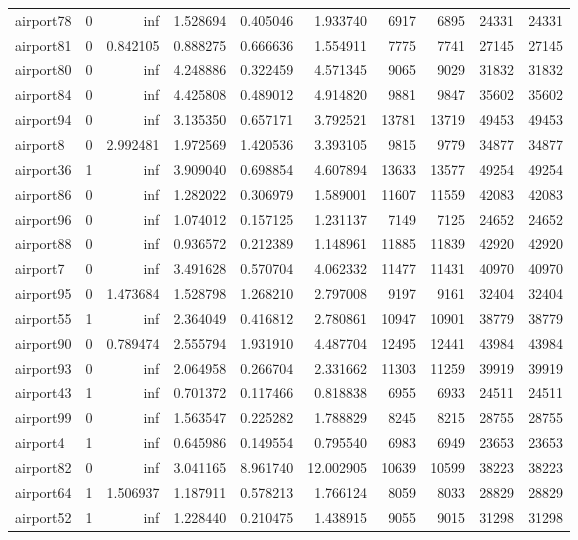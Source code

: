 \begin{longtable}{|l|r|r|r|r|r|r|r|r|r|}
airport78 & 0 & inf & 1.528694 & 0.405046 & 1.933740 & 6917 & 6895 & 24331 & 24331 \\
airport81 & 0 & 0.842105 & 0.888275 & 0.666636 & 1.554911 & 7775 & 7741 & 27145 & 27145 \\
airport80 & 0 & inf & 4.248886 & 0.322459 & 4.571345 & 9065 & 9029 & 31832 & 31832 \\
airport84 & 0 & inf & 4.425808 & 0.489012 & 4.914820 & 9881 & 9847 & 35602 & 35602 \\
airport94 & 0 & inf & 3.135350 & 0.657171 & 3.792521 & 13781 & 13719 & 49453 & 49453 \\
airport8 & 0 & 2.992481 & 1.972569 & 1.420536 & 3.393105 & 9815 & 9779 & 34877 & 34877 \\
airport36 & 1 & inf & 3.909040 & 0.698854 & 4.607894 & 13633 & 13577 & 49254 & 49254 \\
airport86 & 0 & inf & 1.282022 & 0.306979 & 1.589001 & 11607 & 11559 & 42083 & 42083 \\
airport96 & 0 & inf & 1.074012 & 0.157125 & 1.231137 & 7149 & 7125 & 24652 & 24652 \\
airport88 & 0 & inf & 0.936572 & 0.212389 & 1.148961 & 11885 & 11839 & 42920 & 42920 \\
airport7 & 0 & inf & 3.491628 & 0.570704 & 4.062332 & 11477 & 11431 & 40970 & 40970 \\
airport95 & 0 & 1.473684 & 1.528798 & 1.268210 & 2.797008 & 9197 & 9161 & 32404 & 32404 \\
airport55 & 1 & inf & 2.364049 & 0.416812 & 2.780861 & 10947 & 10901 & 38779 & 38779 \\
airport90 & 0 & 0.789474 & 2.555794 & 1.931910 & 4.487704 & 12495 & 12441 & 43984 & 43984 \\
airport93 & 0 & inf & 2.064958 & 0.266704 & 2.331662 & 11303 & 11259 & 39919 & 39919 \\
airport43 & 1 & inf & 0.701372 & 0.117466 & 0.818838 & 6955 & 6933 & 24511 & 24511 \\
airport99 & 0 & inf & 1.563547 & 0.225282 & 1.788829 & 8245 & 8215 & 28755 & 28755 \\
airport4 & 1 & inf & 0.645986 & 0.149554 & 0.795540 & 6983 & 6949 & 23653 & 23653 \\
airport82 & 0 & inf & 3.041165 & 8.961740 & 12.002905 & 10639 & 10599 & 38223 & 38223 \\
airport64 & 1 & 1.506937 & 1.187911 & 0.578213 & 1.766124 & 8059 & 8033 & 28829 & 28829 \\
airport52 & 1 & inf & 1.228440 & 0.210475 & 1.438915 & 9055 & 9015 & 31298 & 31298 \\

\end{longtable}
